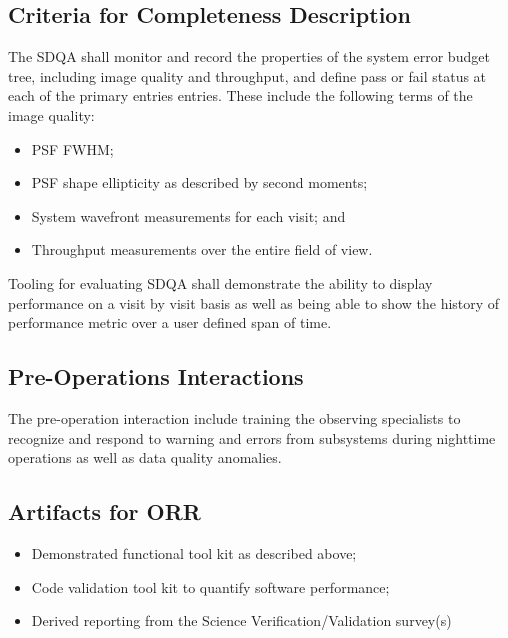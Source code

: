 \subsection{Criteria for Completeness Description}

The SDQA shall monitor and record the properties of the system error budget tree, including image quality and throughput, and define pass or fail status at each of the primary entries entries.   These include the following terms of the image quality:

\begin{itemize}

	\item PSF FWHM;
	\item PSF shape ellipticity as described by second moments;
	\item System wavefront measurements for each visit; and
	\item Throughput measurements over the entire field of view.

\end{itemize}

Tooling for evaluating SDQA shall demonstrate the ability to display performance on a visit by visit basis as well as being able to show the history of performance metric over a user defined span of time.

\subsection{Pre-Operations Interactions}
The pre-operation interaction include training the observing specialists to recognize and respond to warning and errors from subsystems during nighttime operations as well as data quality anomalies.

\subsection{Artifacts for ORR}

\begin{itemize}

	\item Demonstrated functional tool kit as described above;
	\item Code validation tool kit to quantify software performance;
	\item Derived reporting from the Science Verification/Validation survey(s)

\end{itemize}





